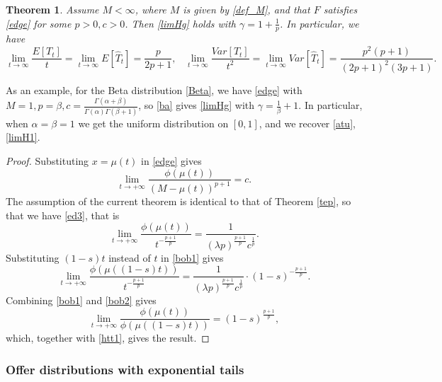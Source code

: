 \documentclass{article}
\newtheorem{thm}{Theorem}[section]
\numberwithin{equation}{section}
\begin{document}
\begin{thm}
Assume $M<\infty$, where $M$ is given by \eqref{def_M}, and that $F$ satisfies \eqref{edge} for some $p>0,c>0$.
Then \eqref{limHg} holds with $\gamma=1+\frac{1}{p}$. In particular, we have
\begin{equation}\label{lg1}\lim_{t\rightarrow \infty}\frac{E[T_t]}{t}=\lim_{t\rightarrow \infty}E[\hat{T}_t]=\frac{p}{2p+1},\;\;\;\lim_{t\rightarrow \infty}\frac{Var[T_t]}{t^2}=\lim_{t\rightarrow \infty}Var[\hat{T}_t]=\frac{p^2(p+1)}{(2p+1)^2(3p+1)}.\end{equation}

\end{thm}
As an example, for the Beta distribution \eqref{Beta}, we have \eqref{edge} with 
$M=1,p=\beta,c=\frac{\Gamma(\alpha+\beta)}{\Gamma(\alpha)\Gamma(\beta+1)}$,
so \eqref{ba} gives \eqref{limHg} with $\gamma=\frac{1}{\beta}+1$.
In particular, when $\alpha=\beta=1$ we get the uniform distribution on $[0,1]$, and we recover \eqref{atu}, \eqref{limH1}.


\begin{proof}

Substituting $x=\mu(t)$ in \eqref{edge}
gives
\begin{equation}\label{lll1}
\lim_{t\rightarrow +\infty}\frac{\phi(\mu(t))}{(M-\mu(t))^{p+1}}=c.
\end{equation}
The assumption of the current 
theorem is identical to that of Theorem \ref{tep}, so that we have \eqref{ed3}, that is
\begin{equation}\label{bob1}\lim_{t\rightarrow +\infty}\frac{\phi(\mu(t))}{t^{-\frac{p+1}{p}}}=\frac{1}{(\lambda p)^{\frac{p+1}{p} }c^{\frac{1}{p}}}.\end{equation}
Substituting $(1-s)t$ instead of $t$
in \eqref{bob1} gives
\begin{equation}\label{bob2}\lim_{t\rightarrow +\infty}\frac{\phi(\mu((1-s)t))}{t^{-\frac{p+1}{p}}}=\frac{1}{(\lambda p)^{\frac{p+1}{p} }c^{\frac{1}{p}}}\cdot (1-s)^{-\frac{p+1}{p}}.\end{equation}
Combining \eqref{bob1} and \eqref{bob2} gives
$$\lim_{t\rightarrow +\infty}\frac{\phi(\mu(t))}{\phi(\mu((1-s)t))}=(1-s)^{\frac{p+1}{p}},$$
which, together with \eqref{htt1},
gives the result.
\end{proof}

\subsubsection{Offer distributions with 
exponential tails}
\end{document}
